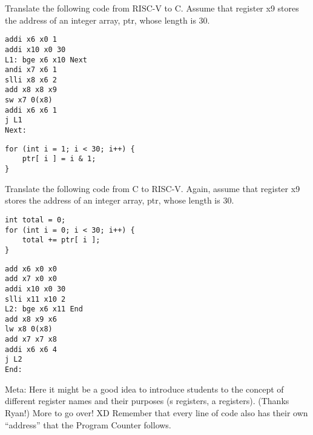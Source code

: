 \begin{blocksection}
\question Translate the following code from RISC-V to C. Assume that register x9 stores the address of an integer array, ptr, whose length is 30.

\begin{verbatim}
addi x6 x0 1
addi x10 x0 30
L1: bge x6 x10 Next 
andi x7 x6 1 
slli x8 x6 2 
add x8 x8 x9 
sw x7 0(x8) 
addi x6 x6 1 
j L1
Next:
\end{verbatim}

\begin{solution}[0.5in]
\begin{verbatim}
for (int i = 1; i < 30; i++) { 
    ptr[ i ] = i & 1; 
}
\end{verbatim}
\end{solution}

\question Translate the following code from C to RISC-V. Again, assume that register x9 stores the address of an integer array, ptr, whose length is 30.

\begin{verbatim}
int total = 0;
for (int i = 0; i < 30; i++) { 
    total += ptr[ i ]; 
}
\end{verbatim}

\begin{solution}[1.5in]
\begin{verbatim}
add x6 x0 x0
add x7 x0 x0
addi x10 x0 30
slli x11 x10 2
L2: bge x6 x11 End 
add x8 x9 x6 
lw x8 0(x8) 
add x7 x7 x8 
addi x6 x6 4 
j L2
End:
\end{verbatim}

Meta: 
Here it might be a good idea to introduce students to the concept of different register names and their purposes (s registers, a registers). (Thanks Ryan!) More to go over! XD
Remember that every line of code also has their own “address” that the Program Counter follows.

\end{solution}

\end{blocksection}